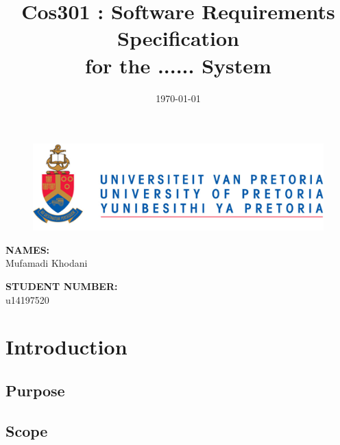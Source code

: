 \documentclass[english]{article}
\title{Cos301 : Software Requirements Specification\\
	for the ...... System\\
	}
\date{\today}
\begin{document}
	\maketitle
	\begin{figure}[!t]
		\includegraphics{up_logo.png}
	\end{figure}
	\begin{minipage}{0.4\textwidth}
		\begin{flushleft} \large
			\textbf{NAMES:}\\[0.4cm]
			Mufamadi {Khodani}
		\end{flushleft}
	\end{minipage}
	\begin{minipage}{0.4\textwidth}
		\begin{flushright} \large
			\textbf{STUDENT NUMBER:} \\[0.4cm]
			u14197520
		\end{flushright}
	\end{minipage}


	
	\newpage

	\tableofcontents
	\newpage

	

	\section{Introduction}
			

		\subsection{Purpose}
			

		\subsection{Scope}
\end{document}
